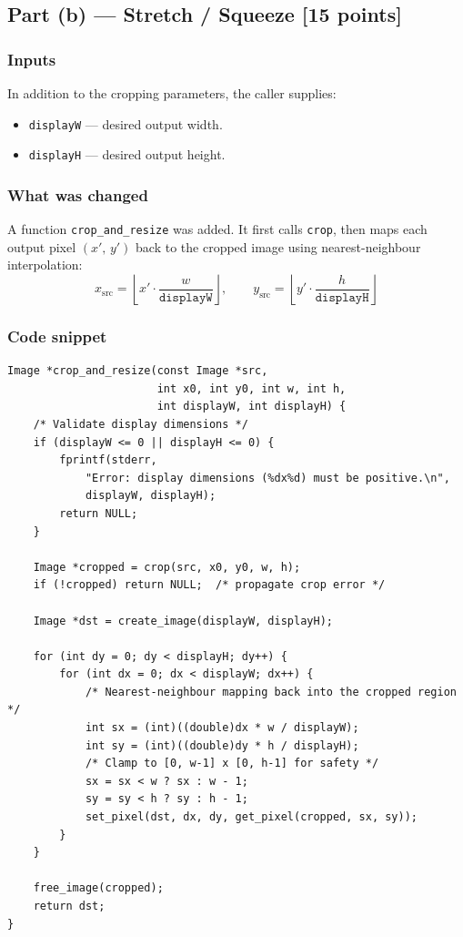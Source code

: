 \documentclass[12pt,a4paper]{article}
\begin{document}
\subsection{Part (b) — Stretch / Squeeze \textnormal{[15 points]}}

\subsubsection*{Inputs}
In addition to the cropping parameters, the caller supplies:
\begin{itemize}
    \item \texttt{displayW} — desired output width.
    \item \texttt{displayH} — desired output height.
\end{itemize}

\subsubsection*{What was changed}
A function \texttt{crop\_and\_resize} was added.
It first calls \texttt{crop}, then maps each output pixel
\((x',\, y')\) back to the cropped image using nearest-neighbour
interpolation:
\[
    x_{\text{src}} = \left\lfloor x' \cdot \frac{w}{\texttt{displayW}} \right\rfloor,
    \qquad
    y_{\text{src}} = \left\lfloor y' \cdot \frac{h}{\texttt{displayH}} \right\rfloor
\]

\subsubsection*{Code snippet}

\begin{lstlisting}
Image *crop_and_resize(const Image *src,
                       int x0, int y0, int w, int h,
                       int displayW, int displayH) {
    /* Validate display dimensions */
    if (displayW <= 0 || displayH <= 0) {
        fprintf(stderr,
            "Error: display dimensions (%dx%d) must be positive.\n",
            displayW, displayH);
        return NULL;
    }

    Image *cropped = crop(src, x0, y0, w, h);
    if (!cropped) return NULL;  /* propagate crop error */

    Image *dst = create_image(displayW, displayH);

    for (int dy = 0; dy < displayH; dy++) {
        for (int dx = 0; dx < displayW; dx++) {
            /* Nearest-neighbour mapping back into the cropped region */
            int sx = (int)((double)dx * w / displayW);
            int sy = (int)((double)dy * h / displayH);
            /* Clamp to [0, w-1] x [0, h-1] for safety */
            sx = sx < w ? sx : w - 1;
            sy = sy < h ? sy : h - 1;
            set_pixel(dst, dx, dy, get_pixel(cropped, sx, sy));
        }
    }

    free_image(cropped);
    return dst;
}
\end{lstlisting}
\end{document}
